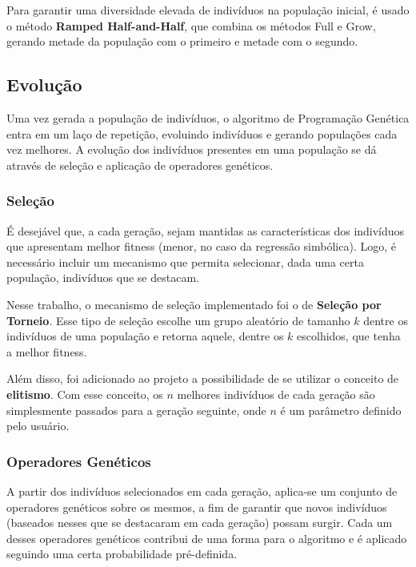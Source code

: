 \documentclass[12pt]{article}
\begin{document}
Para garantir uma diversidade elevada de indivíduos na população inicial, é usado o
método \textbf{Ramped Half-and-Half}, que combina os métodos Full e Grow, gerando
metade da população com o primeiro e metade com o segundo.

\subsection{Evolução}

Uma vez gerada a população de indivíduos, o algoritmo de Programação Genética entra
em um laço de repetição, evoluindo indivíduos e gerando populações cada vez melhores.
A evolução dos indivíduos presentes em uma população se dá através de seleção e aplicação
de operadores genéticos.

\subsubsection{Seleção}

É desejável que, a cada geração, sejam mantidas as características dos indivíduos que
apresentam melhor fitness (menor, no caso da regressão simbólica). Logo, é necessário
incluir um mecanismo que permita selecionar, dada uma certa população, indivíduos que
se destacam.

Nesse trabalho, o mecanismo de seleção implementado foi o de \textbf{Seleção por Torneio}.
Esse tipo de seleção escolhe um grupo aleatório de tamanho $ k $ dentre os indivíduos
de uma população e retorna aquele, dentre os $ k $ escolhidos, que tenha a melhor fitness.

Além disso, foi adicionado ao projeto a possibilidade de se utilizar o conceito de 
\textbf{elitismo}. Com esse conceito, os $ n $ melhores indivíduos de cada geração são
simplesmente passados para a geração seguinte, onde $ n $ é um parâmetro definido pelo
usuário.

\subsubsection{Operadores Genéticos}

A partir dos indivíduos selecionados em cada geração, aplica-se um conjunto de operadores
genéticos sobre os mesmos, a fim de garantir que novos indivíduos (baseados nesses que
se destacaram em cada geração) possam surgir. Cada um desses operadores genéticos contribui
de uma forma para o algoritmo e é aplicado seguindo uma certa probabilidade pré-definida.
\end{document}
